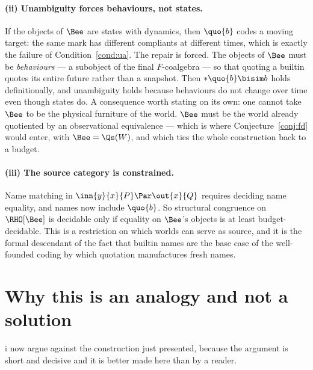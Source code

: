 \paragraph{(ii) Unambiguity forces behaviours, not states.}
If the objects of $\Bee$ are states with dynamics, then $\quo{b}$
codes a moving target: the same mark has different compliants at
different times, which is exactly the failure of
Condition~\ref{cond:ua}.
The repair is forced.
The objects of $\Bee$ must be \emph{behaviours} --- a subobject of
the final $F$-coalgebra --- so that quoting a builtin quotes its
entire future rather than a snapshot.
Then $*\quo{b} \bisim b$ holds definitionally, and unambiguity
holds because behaviours do not change over time even though states
do.
A consequence worth stating on its own: one cannot take $\Bee$ to
be the physical furniture of the world.
$\Bee$ must be the world already quotiented by an observational
equivalence --- which is where Conjecture~\ref{conj:fd} would
enter, with $\Bee = \Qs(W)$, and which ties the whole construction
back to a budget.

\paragraph{(iii) The source category is constrained.}
Name matching in $\inn{y}{x}{P} \Par \out{x}{Q}$ requires deciding
name equality, and names now include $\quo{b}$.
So structural congruence on $\RHO[\Bee]$ is decidable only if
equality on $\Bee$'s objects is at least budget-decidable.
This is a restriction on which worlds can serve as source, and it
is the formal descendant of the fact that builtin names are the
base case of the well-founded coding by which quotation
manufactures fresh names.

\section{Why this is an analogy and not a solution}
\label{sec:notasolution}

i now argue against the construction just presented, because the
argument is short and decisive and it is better made here than by a
reader.

